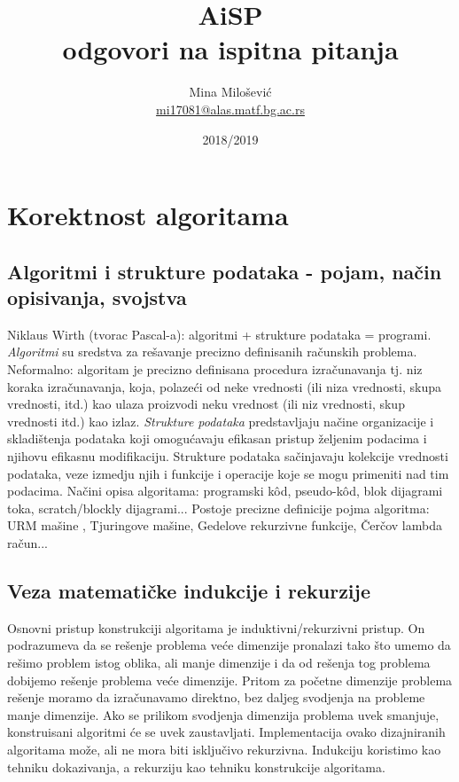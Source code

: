 \documentclass{article}
\title{AiSP \\ odgovori na ispitna pitanja}
\author{Mina Milošević \\
\href{mailto:mi17081@alas.matf.bg.ac.rs}{mi17081@alas.matf.bg.ac.rs}}
\date{2018/2019}
\begin{document}
\maketitle
\newpage
\renewcommand*\contentsname{Sadržaj}
\tableofcontents
\newpage
\section{Korektnost algoritama}
\subsection{Algoritmi i strukture podataka - pojam, način opisivanja, svojstva}
Niklaus Wirth (tvorac Pascal-a): algoritmi + strukture podataka = programi. \textit{Algoritmi} su sredstva za rešavanje precizno definisanih računskih problema.
\newline Neformalno: algoritam je precizno definisana procedura izračunavanja tj. niz koraka izračunavanja, koja, polazeći od neke vrednosti (ili niza vrednosti, skupa vrednosti, itd.) kao ulaza proizvodi neku vrednost (ili niz vrednosti, skup vrednosti itd.) kao izlaz.
\newline \textit{Strukture podataka} predstavljaju načine organizacije i skladištenja podataka koji omogućavaju efikasan pristup željenim podacima i njihovu efikasnu modifikaciju. Strukture podataka sačinjavaju kolekcije vrednosti podataka, veze izmedju njih i funkcije i operacije koje se mogu primeniti nad tim 
podacima.
Načini opisa algoritama: programski kôd, pseudo-kôd, blok dijagrami toka, scratch/blockly dijagrami...
Postoje precizne definicije pojma algoritma: URM mašine , Tjuringove mašine, Gedelove rekurzivne funkcije, Čerčov lambda račun...

\subsection{Veza matematičke indukcije i rekurzije}
Osnovni pristup konstrukciji algoritama je induktivni/rekurzivni pristup. On podrazumeva da se rešenje problema veće dimenzije pronalazi tako što umemo da rešimo problem istog oblika, ali manje dimenzije i da od rešenja tog problema dobijemo rešenje problema veće dimenzije. Pritom za početne dimenzije problema rešenje moramo da izračunavamo direktno, bez daljeg svodjenja na probleme manje dimenzije. Ako se prilikom svodjenja dimenzija problema uvek smanjuje, 
konstruisani algoritmi će se uvek zaustavljati. Implementacija ovako dizajniranih algoritama može, ali ne mora biti isključivo rekurzivna. Indukciju koristimo kao tehniku dokazivanja, a rekurziju kao tehniku konstrukcije algoritama.
\end{document}
